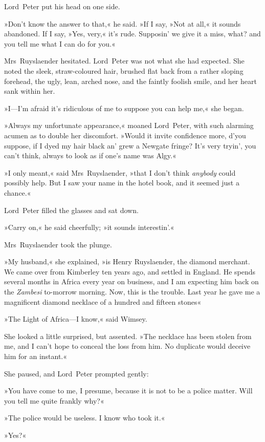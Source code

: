 Lord~Peter put his head on one side.

»Don't know the answer to that,« he said. »If I say, »Not at all,« it sounds abandoned. If I say, »Yes, very,« it's rude. Supposin' we give it a miss, what? and you tell me what I can do for you.«

Mrs~Ruyslaender hesitated. Lord~Peter was not what she had expected. She noted the sleek, straw-coloured hair, brushed flat back from a rather sloping forehead, the ugly, lean, arched nose, and the faintly foolish smile, and her heart sank within her.

»I—I'm afraid it's ridiculous of me to suppose you can help me,« she began.

»Always my unfortunate appearance,« moaned Lord~Peter, with such alarming acumen as to double her discomfort. »Would it invite confidence more, d'you suppose, if I dyed my hair black an' grew a Newgate fringe? It's very tryin', you can't think, always to look as if one's name was Algy.«

»I only meant,« said Mrs~Ruyslaender, »that I don't think \textit{anybody} could possibly help. But I saw your name in the hotel book, and it seemed just a chance.«

Lord~Peter filled the glasses and sat down.

»Carry on,« he said cheerfully; »it sounds interestin'.«

Mrs~Ruyslaender took the plunge.

»My husband,« she explained, »is Henry Ruyslaender, the diamond merchant. We came over from Kimberley ten years ago, and settled in England. He spends several months in Africa every year on business, and I am expecting him back on the \textit{Zambesi} to-morrow morning. Now, this is the trouble. Last year he gave me a magnificent diamond necklace of a hundred and fifteen stones\longdash«

»The Light of Africa—I know,« said Wimsey.

She looked a little surprised, but assented. »The necklace has been stolen from me, and I can't hope to conceal the loss from him. No duplicate would deceive him for an instant.«

She paused, and Lord~Peter prompted gently:

»You have come to me, I presume, because it is not to be a police matter. Will you tell me quite frankly why?«

»The police would be useless. I know who took it.«

»Yes?«

